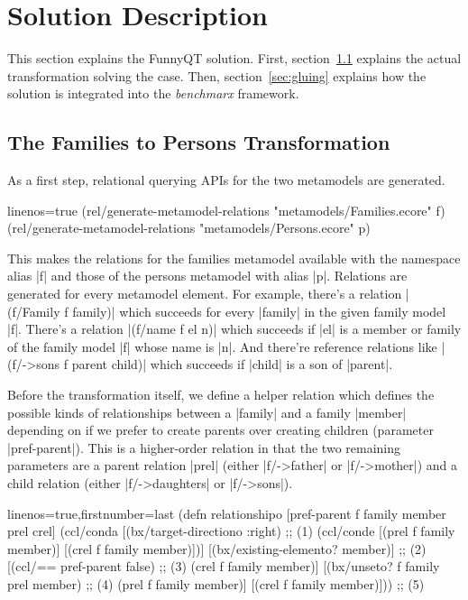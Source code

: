 \documentclass[a4paper]{article}
\newcommand{\code}{\clojureinline}
\begin{document}
\section{Solution Description}
\label{sec:solution-description}

This section explains the FunnyQT solution.  First,
section~\ref{sec:f2p-solution} explains the actual transformation solving the
case.  Then, section~\ref{sec:gluing} explains how the solution is integrated
into the \emph{benchmarx} framework.


\subsection{The Families to Persons Transformation}
\label{sec:f2p-solution}

As a first step, relational querying APIs for the two metamodels are generated.

\begin{clojurecode*}{linenos=true}
(rel/generate-metamodel-relations "metamodels/Families.ecore" f)
(rel/generate-metamodel-relations "metamodels/Persons.ecore" p)
\end{clojurecode*}

This makes the relations for the families metamodel available with the
namespace alias \code|f| and those of the persons metamodel with alias
\code|p|.  Relations are generated for every metamodel element.  For example,
there's a relation \code|(f/Family f family)| which succeeds for every
\code|family| in the given family model \code|f|.  There's a relation
\code|(f/name f el n)| which succeeds if \code|el| is a member or family of the
family model \code|f| whose name is \code|n|.  And there're reference relations
like \code|(f/->sons f parent child)| which succeeds if \code|child| is a son
of \code|parent|.

Before the transformation itself, we define a helper relation which defines the
possible kinds of relationships between a \code|family| and a family
\code|member| depending on if we prefer to create parents over creating
children (parameter \code|pref-parent|).  This is a higher-order relation in
that the two remaining parameters are a parent relation \code|prel| (either
\code|f/->father| or \code|f/->mother|) and a child relation (either
\code|f/->daughters| or \code|f/->sons|).

\begin{clojurecode*}{linenos=true,firstnumber=last}
(defn relationshipo [pref-parent f family member prel crel]
  (ccl/conda
   [(bx/target-directiono :right)     ;; (1)
    (ccl/conde
     [(prel f family member)]
     [(crel f family member)])]
   [(bx/existing-elemento? member)]   ;; (2)
   [(ccl/== pref-parent false)        ;; (3)
    (crel f family member)]
   [(bx/unseto? f family prel member) ;; (4)
    (prel f family member)]
   [(crel f family member)]))         ;; (5)
\end{clojurecode*}
\end{document}
